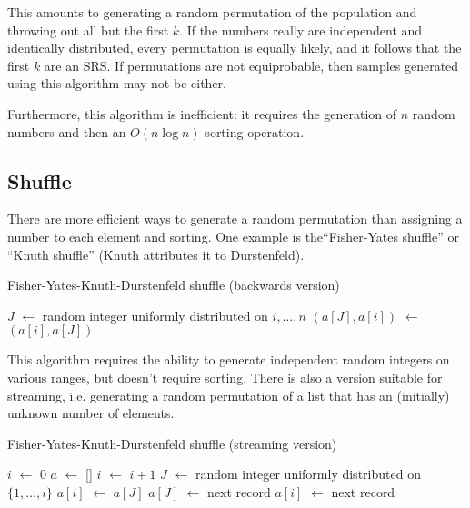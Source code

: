 \documentclass[12pt]{article}
\newcommand*\Let[2]{\State #1 $\gets$ #2}
\begin{document}
This amounts to generating a random permutation of the population and throwing out all but the first $k$.
If the numbers really are independent and identically distributed, every permutation is equally likely, and it follows that the first $k$ are an SRS.
If permutations are not equiprobable, then samples generated using this algorithm may not be either.

Furthermore, this algorithm is inefficient: it requires the generation of $n$ random numbers and then an $O(n\log n)$ sorting operation.

\subsection{Shuffle}
There are more efficient ways to generate a random permutation than assigning a number to each element and sorting.
One example is the``Fisher-Yates shuffle'' or ``Knuth shuffle'' (Knuth attributes it to Durstenfeld).

\begin{algorithm}                      %
\caption{Fisher-Yates-Knuth-Durstenfeld shuffle (backwards version)}          %
\label{FYKD}                           %
\begin{algorithmic}[1]               %
    \Let{$J$}{random integer uniformly distributed on $i, \dots, n$}
    \Let{$(a[J], a[i])$}{$(a[i], a[J])$}
\EndFor
\end{algorithmic}
\end{algorithm}

This algorithm requires the ability to generate independent random integers on various ranges, but doesn't require sorting.
There is also a version suitable for streaming, i.e. generating a random permutation of a list that has an (initially) unknown number of elements.

\begin{algorithm}                      %
\caption{Fisher-Yates-Knuth-Durstenfeld shuffle (streaming version)}          %
\label{FYKD-streaming}                           %
\begin{algorithmic}[1]               %
\Let{$i$}{0}
\Let{$a$}{[]}
    \Let{$i$}{$i+1$}
    \Let{$J$}{random integer uniformly distributed on $\{1, \dots, i\}$}
        \Let{$a[i]$}{$a[J]$}
        \Let{$a[J]$}{next record}
    \Else
        \Let{$a[i]$}{next record} 
    \EndIf
\EndWhile \\
\end{algorithmic}
\end{algorithm}
\end{document}

